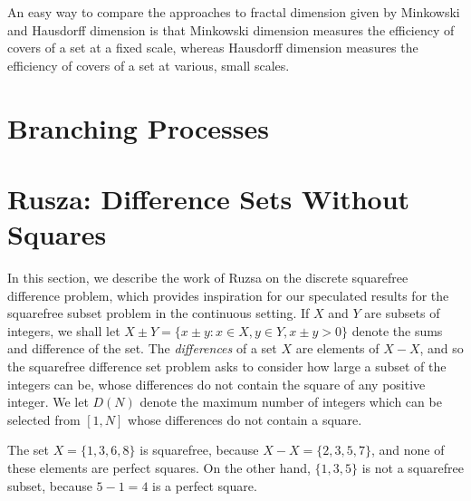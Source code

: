 An easy way to compare the approaches to fractal dimension given by Minkowski and Hausdorff dimension is that Minkowski dimension measures the efficiency of covers of a set at a fixed scale, whereas Hausdorff dimension measures the efficiency of covers of a set at various, small scales.




\section{Branching Processes}

\section{Rusza: Difference Sets Without Squares}

In this section, we describe the work of Ruzsa on the discrete squarefree difference problem, which provides inspiration for our speculated results for the squarefree subset problem in the continuous setting. If $X$ and $Y$ are subsets of integers, we shall let $X \pm Y = \{ x \pm y: x \in X, y \in Y, x \pm y > 0 \}$ denote the sums and difference of the set. The {\it differences} of a set $X$ are elements of $X - X$, and so the squarefree difference set problem asks to consider how large a subset of the integers can be, whose differences do not contain the square of any positive integer. We let $D(N)$ denote the maximum number of integers which can be selected from $[1,N]$ whose differences do not contain a square.

\begin{example}
    The set $X = \{ 1, 3, 6, 8 \}$ is squarefree, because $X - X = \{ 2, 3, 5, 7 \}$, and none of these elements are perfect squares. On the other hand, $\{ 1, 3, 5 \}$ is not a squarefree subset, because $5 - 1 = 4$ is a perfect square.
\end{example}

